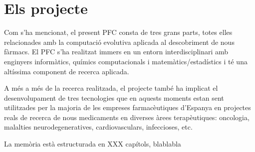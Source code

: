 \section{Els projecte}

Com s’ha mencionat, el present PFC consta de tres grans
parts, totes elles relacionades amb la computació evolutiva aplicada al
descobriment de nous fàrmacs. El PFC s’ha realitzat immers en un entorn
interdisciplinari amb enginyers informàtics, químics computacionals i
matemàtics/estadístics i té una altíssima component de recerca aplicada. 

A més a més de la recerca realitzada, el projecte també ha implicat el
desenvolupament de tres tecnologies que en aquests moments estan sent
utilitzades per la majoria de les empreses farmacèutiques d’Espanya en projectes
reals de recerca de nous medicaments en diverses àrees terapèutiques: oncologia,
malalties neurodegeneratives, cardiovasculars, infeccioses, etc.

La memòria està estructurada en XXX capítols, blablabla
